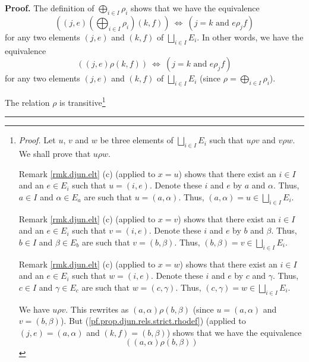 \documentclass[numbers=enddot,12pt,final,onecolumn,notitlepage,abstracton]{scrartcl}
\theoremstyle{definition}
\newenvironment{proof}[1][Proof]{\noindent\textbf{#1.} }{\ \rule{0.5em}{0.5em}}
\newenvironment{verlong}{}{}
\begin{document}
\begin{verlong}
\begin{footnotesize}
\begin{proof}
The definition of $\bigoplus_{i\in I}\rho_{i}$ shows that we have the
equivalence%
\[
\left(  \left(  j,e\right)  \left(  \bigoplus_{i\in I}\rho_{i}\right)  \left(
k,f\right)  \right)  \ \Longleftrightarrow\ \left(  j=k\text{ and }e\rho
_{j}f\right)
\]
for any two elements $\left(  j,e\right)  $ and $\left(  k,f\right)  $ of
$\bigsqcup_{i\in I}E_{i}$. In other words, we have the equivalence%
\begin{equation}
\left(  \left(  j,e\right)  \rho\left(  k,f\right)  \right)
\ \Longleftrightarrow\ \left(  j=k\text{ and }e\rho_{j}f\right)
\label{pf.prop.djun.rels.strict.rhodef}%
\end{equation}
for any two elements $\left(  j,e\right)  $ and $\left(  k,f\right)  $ of
$\bigsqcup_{i\in I}E_{i}$ (since $\rho=\bigoplus_{i\in I}\rho_{i}$).

The relation $\rho$ is transitive\footnote{\textit{Proof.} Let $u$, $v$ and
$w$ be three elements of $\bigsqcup_{i\in I}E_{i}$ such that $u\rho v$ and
$v\rho w$. We shall prove that $u\rho w$.
\par
Remark \ref{rmk.djun.elt} (c) (applied to $x=u$) shows that there exist an
$i\in I$ and an $e\in E_{i}$ such that $u=\left(  i,e\right)  $. Denote these
$i$ and $e$ by $a$ and $\alpha$. Thus, $a\in I$ and $\alpha\in E_{a}$ are such
that $u=\left(  a,\alpha\right)  $. Thus, $\left(  a,\alpha\right)
=u\in\bigsqcup_{i\in I}E_{i}$.
\par
Remark \ref{rmk.djun.elt} (c) (applied to $x=v$) shows that there exist an
$i\in I$ and an $e\in E_{i}$ such that $v=\left(  i,e\right)  $. Denote these
$i$ and $e$ by $b$ and $\beta$. Thus, $b\in I$ and $\beta\in E_{b}$ are such
that $v=\left(  b,\beta\right)  $. Thus, $\left(  b,\beta\right)
=v\in\bigsqcup_{i\in I}E_{i}$.
\par
Remark \ref{rmk.djun.elt} (c) (applied to $x=w$) shows that there exist an
$i\in I$ and an $e\in E_{i}$ such that $w=\left(  i,e\right)  $. Denote these
$i$ and $e$ by $c$ and $\gamma$. Thus, $c\in I$ and $\gamma\in E_{c}$ are such
that $w=\left(  c,\gamma\right)  $. Thus, $\left(  c,\gamma\right)
=w\in\bigsqcup_{i\in I}E_{i}$.
\par
We have $u\rho v$. This rewrites as $\left(  a,\alpha\right)  \rho\left(
b,\beta\right)  $ (since $u=\left(  a,\alpha\right)  $ and $v=\left(
b,\beta\right)  $). But (\ref{pf.prop.djun.rels.strict.rhodef}) (applied to
$\left(  j,e\right)  =\left(  a,\alpha\right)  $ and $\left(  k,f\right)
=\left(  b,\beta\right)  $) shows that we have the equivalence%
\[
\left(  \left(  a,\alpha\right)  \rho\left(  b,\beta\right)  \right)
\]}
\end{proof}
\end{footnotesize}
\end{verlong}
\end{document}
